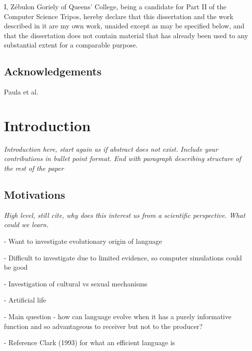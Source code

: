 \documentclass[12pt,a4paper,twoside,openright]{report}
\begin{document}
I, Z\'ebulon Goriely of Queens' College, being a candidate for Part II of the Computer
Science Tripos, hereby declare
that this dissertation and the work described in it are my own work,
unaided except as may be specified below, and that the dissertation
does not contain material that has already been used to any substantial
extent for a comparable purpose.

\bigskip
{}

\medskip
{}

\tableofcontents

\listoffigures

\newpage
\section*{Acknowledgements}

Paula et al.


\pagestyle{headings}

\chapter{Introduction}

\emph{Introduction here, start again as if abstract does not exist. Include your contributions in bullet point format. End with paragraph describing structure of the rest of the paper}

\section{Motivations}

\emph{High level, still cite, why does this interest us from a scientific perspective. What could we learn.}

- Want to investigate evolutionary origin of language

- Difficult to investigate due to limited evidence, so computer simulations could be good

- Investigation of cultural vs sexual mechanisms

- Artificial life

- Main question - how can language evolve when it has a purely informative function and so advantageous to receiver but not to the producer?

- Reference Clark (1993) for what an efficient language is
\end{document}
